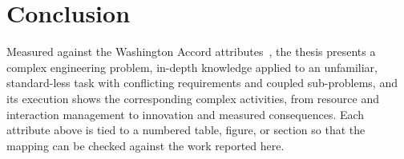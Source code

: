 \section{Conclusion}
Measured against the Washington Accord attributes~\cite{iea2021gapc}, the
thesis presents a complex engineering problem, in-depth knowledge applied to
an unfamiliar, standard-less task with conflicting requirements and coupled
sub-problems, and its execution shows the corresponding complex activities,
from resource and interaction management to innovation and measured
consequences. Each attribute above is tied to a numbered table, figure, or
section so that the mapping can be checked against the work reported here.
